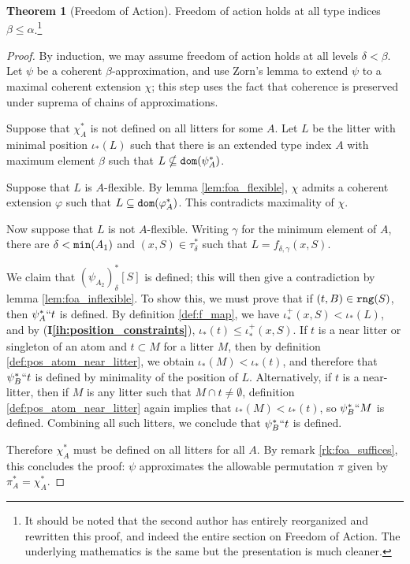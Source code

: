 \documentclass[112pt]{article}
\theoremstyle{definition}
\newtheorem{theorem}{Theorem}[section]
\theoremstyle{remark}
\newcommand{\ihref}[1]{(\textbf{I\ref{#1}})}
\newcommand{\suggest}[1]{{\color{red} #1}}
\newcommand{\hsuggest}[1]{{\color{magenta}#1}}
\begin{document}
\begin{theorem}[Freedom of Action]\label{thm:foa}
  Freedom of action holds at all type indices $\beta \leq \alpha$.\footnote{It should be noted that the second author has entirely reorganized and rewritten this proof, and indeed the entire section on Freedom of Action.  The underlying mathematics is the same but the presentation is much cleaner.}
\end{theorem}
\begin{proof}
  By induction, we may assume freedom of action holds at all levels $\delta < \beta$.
  Let $\psi$ be a coherent $\beta$-approximation, and use Zorn's lemma to extend $\psi$ to a maximal coherent extension $\chi$; this step uses the fact that coherence is preserved under suprema of chains of approximations.

  Suppose that $\chi_A^*$ is not defined on all litters for some $A$.
  Let $L$ be the litter with minimal position $\iota_*(L)$ such that there is %
  {an extended type index $A$}
  with maximum element $\beta$ such that $L \nsubseteq {\tt dom}(\psi_A^*)$.

  Suppose that $L$ is $A$-flexible.
  By lemma \ref{lem:foa_flexible}, $\chi$ admits a coherent extension $\varphi$ such that $L \subseteq {\tt dom}(\varphi_A^*)$.
  This contradicts maximality of $\chi$.

  Now suppose that $L$ is not $A$-flexible.
  Writing $\gamma$ for the minimum element of $A$, there are $\delta < {\tt min}(A_1)$ and $(x, S) \in \tau_\delta^*$ such that $L = f_{\delta,\gamma}(x, S)$.


  We claim that $(\psi_{A_2})_\delta^*[S]$ is defined; this will then give a contradiction by lemma \ref{lem:foa_inflexible}.
  To show this, we must prove that if $(t, B) \in {\tt rng}(S)$, then $\psi_A^*``t$ is defined.
  By definition \ref{def:f_map}, we have $\iota_*^+(x, S) < \iota_*(L)$, and by \ihref{ih:position_constraints}, $\iota_*(t) \leq \iota_*^+(x, S)$.
  If $t$ is a near litter or singleton of an atom and $t \subset M$ for a litter $M$, then by definition \ref{def:pos_atom_near_litter}, we obtain $\iota_*(M) < \iota_*(t)$, and therefore that $\psi_B^*``t$ is defined by minimality of the position of $L$.%
  Alternatively, if $t$ is a near-litter, then if $M$ is any litter such that $M \cap t \neq \emptyset$, definition \ref{def:pos_atom_near_litter} again implies that $\iota_*(M) < \iota_*(t)$, so $\psi_B^*``M$ is defined.
  Combining all such litters, we conclude that $\psi_B^*``t$ is defined.

  Therefore $\chi_A^*$ must be defined on all litters for all $A$.
  By remark \ref{rk:foa_suffices}, this concludes the proof: $\psi$ approximates the allowable permutation $\pi$ given by $\pi_A^* = \chi_A^*$.
\end{proof}
\end{document}
